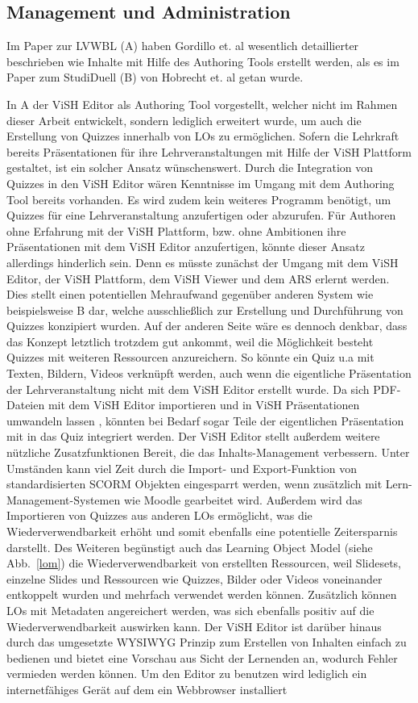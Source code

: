 \documentclass[conference]{IEEEtran}
\begin{document}
\subsection{Management und Administration}
Im Paper zur LVWBL (A) haben Gordillo et. al wesentlich detaillierter beschrieben wie Inhalte mit Hilfe des Authoring Tools erstellt werden, als es im Paper zum StudiDuell (B) von Hobrecht et. al getan wurde. 

In A der ViSH Editor als Authoring Tool vorgestellt, welcher nicht im Rahmen dieser Arbeit entwickelt, sondern lediglich erweitert wurde, um auch die Erstellung von Quizzes innerhalb von LOs zu ermöglichen. Sofern die Lehrkraft bereits Präsentationen für ihre Lehrveranstaltungen mit Hilfe der ViSH Plattform gestaltet, ist ein solcher Ansatz wünschenswert. Durch die Integration von Quizzes in den ViSH Editor wären Kenntnisse im Umgang mit dem Authoring Tool bereits vorhanden. Es wird zudem kein weiteres Programm benötigt, um Quizzes für eine Lehrveranstaltung anzufertigen oder abzurufen. Für Authoren ohne Erfahrung mit der ViSH Plattform, bzw. ohne Ambitionen ihre Präsentationen mit dem ViSH Editor anzufertigen, könnte dieser Ansatz allerdings hinderlich sein. Denn es müsste zunächst der Umgang mit dem ViSH Editor, der ViSH Plattform, dem ViSH Viewer und dem ARS erlernt werden. Dies stellt einen potentiellen Mehraufwand gegenüber anderen System wie beispielsweise B dar, welche ausschließlich zur Erstellung und Durchführung von Quizzes konzipiert wurden. Auf der anderen Seite wäre es dennoch denkbar, dass das Konzept letztlich trotzdem gut ankommt, weil die Möglichkeit besteht Quizzes mit weiteren Ressourcen anzureichern. So könnte ein Quiz u.a mit Texten, Bildern, Videos verknüpft werden, auch wenn die eigentliche Präsentation der Lehrveranstaltung nicht mit dem ViSH Editor erstellt wurde. Da sich PDF-Dateien mit dem ViSH Editor importieren und in ViSH Präsentationen umwandeln lassen \cite[p. 4]{Gordillo2015}, könnten bei Bedarf sogar Teile der eigentlichen Präsentation mit in das Quiz integriert werden. Der ViSH Editor stellt außerdem weitere nützliche Zusatzfunktionen Bereit, die das Inhalts-Management verbessern. Unter Umständen kann viel Zeit durch die Import- und Export-Funktion von standardisierten SCORM Objekten eingesparrt werden, wenn zusätzlich mit Lern-Management-Systemen wie Moodle gearbeitet wird. Außerdem wird das Importieren von Quizzes aus anderen LOs ermöglicht, was die Wiederverwendbarkeit erhöht und somit ebenfalls eine potentielle Zeitersparnis darstellt. Des Weiteren begünstigt auch das Learning Object Model (siehe Abb.~\ref{lom}) die Wiederverwendbarkeit von erstellten Ressourcen, weil Slidesets, einzelne Slides und Ressourcen wie Quizzes, Bilder oder Videos voneinander entkoppelt wurden und mehrfach verwendet werden können. Zusätzlich können LOs mit Metadaten angereichert werden, was sich ebenfalls positiv auf die Wiederverwendbarkeit auswirken kann. Der ViSH Editor ist darüber hinaus durch das umgesetzte WYSIWYG Prinzip zum Erstellen von Inhalten einfach zu bedienen und bietet eine Vorschau aus Sicht der Lernenden an, wodurch Fehler vermieden werden können. Um den Editor zu benutzen wird lediglich ein internetfähiges Gerät auf dem ein Webbrowser installiert 
\end{document}
